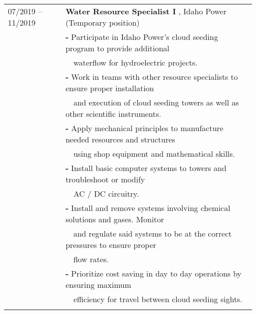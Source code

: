 \documentclass[a4paper,12pt]{article}
\begin{document}
\begin{tabular}{ll}
07/2019 -- 11/2019 & \textbf{Water Resource Specialist I }, Idaho Power (Temporary position)\\
         & \textbf{-} Participate in Idaho Power’s cloud seeding program to provide additional\\
         & \-\ \-\ waterflow for hydroelectric projects.\\
         & \textbf{-} Work in teams with other resource specialists to ensure proper installation\\
         & \-\ \-\ and execution of cloud seeding towers as well as other scientific instruments. \\
         & \textbf{-} Apply mechanical principles to manufacture needed resources and structures\\ 
         & \-\ \-\ using shop equipment and mathematical skills.\\ 
         & \textbf{-} Install basic computer systems to towers and troubleshoot or modify\\ 
         & \-\ \-\ AC / DC circuitry. \\
         & \textbf{-} Install and remove systems involving chemical solutions and gases. Monitor \\
         & \-\ \-\ and regulate said systems to be at the correct pressures to ensure proper\\ 
         & \-\ \-\ flow rates. \\
         & \textbf{-} Prioritize cost saving in day to day operations by ensuring maximum\\
         & \-\ \-\ efficiency for travel between cloud seeding sights. \\
         \\
\end{tabular}
\end{document}
